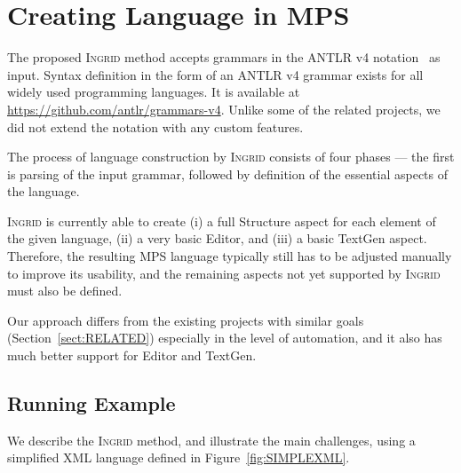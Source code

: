\section{Creating Language in MPS}
\label{sect:LANGDEF}

The proposed \textsc{Ingrid} method accepts grammars in the ANTLR v4 notation~\cite{ref:ANTLRBOOK} as input.
Syntax definition in the form of an ANTLR v4 grammar exists for all widely used programming languages. It is available at \url{https://github.com/antlr/grammars-v4}.
Unlike some of the related projects, we did not extend the notation with any custom features.

The process of language construction by \textsc{Ingrid} consists of four phases --- the first is parsing of the input grammar, followed by definition of the essential aspects of the language.

\textsc{Ingrid} is currently able to create (i) a full Structure aspect for each element of the given language, (ii) a very basic Editor, and (iii) a basic TextGen aspect.
Therefore, the resulting MPS language typically still has to be adjusted manually to improve its usability, and the remaining aspects not yet supported by \textsc{Ingrid} must also be defined.

Our approach differs from the existing projects with similar goals (Section~\ref{sect:RELATED}) especially in the level of automation, and it also has much better support for Editor and TextGen.

\subsection{Running Example}

We describe the \textsc{Ingrid} method, and illustrate the main challenges, using a simplified XML language defined in Figure~\ref{fig:SIMPLEXML}.


